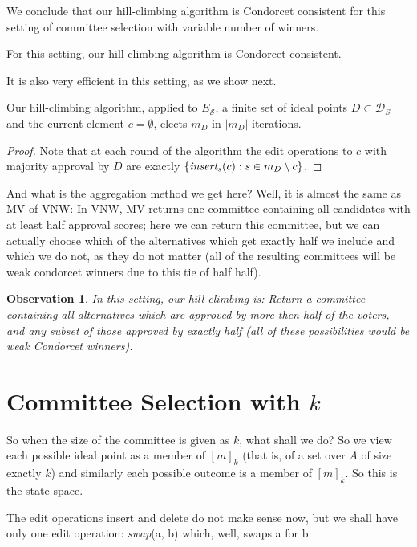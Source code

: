 \documentclass[sigconf]{aamas}  %
\newtheorem{observation}{Observation}
\newcommand{\calD}{\mathcal{D}}
\newcommand{\calS}{\mathcal{S}}
\newcommand{\iinsert}[1]{\emph{insert}_{#1}}
\begin{document}
We conclude that our hill-climbing algorithm is Condorcet consistent for this setting of committee selection with variable number of winners.

\begin{corollary}
  For this setting, our hill-climbing algorithm is Condorcet consistent.
\end{corollary}

It is also very efficient in this setting, as we show next.

\begin{lemma}
Our hill-climbing algorithm, applied to $E_\calS$,  a finite set of ideal points $D \subset \calD_S$ and the current element $c = \emptyset$, elects $m_D$ in $|m_D|$ iterations.
\end{lemma}

\begin{proof}
Note that at each round of the algorithm the edit operations to $c$ with majority approval by $D$ are exactly $\{\iinsert{s}(c) : s \in m_D \setminus c\}$.
\end{proof}

And what is the aggregation method we get here?
Well, it is almost the same as MV of VNW:
  In VNW, MV returns one committee containing all candidates with at least half approval scores; here we can return this committee, but we can actually choose which of the alternatives which get exactly half we include and which we do not, as they do not matter (all of the resulting committees will be weak condorcet winners due to this tie of half half).
  
\begin{observation}
  In this setting, our hill-climbing is:
    Return a committee containing all alternatives which are approved by more then half of the voters, and any subset of those approved by exactly half
    (all of these possibilities would be weak Condorcet winners).
\end{observation}


\section{Committee Selection with $k$}

So when the size of the committee is given as $k$, what shall we do?
So we view each possible ideal point as a member of $[m]_k$ (that is, of a set over $A$ of size exactly $k$) and similarly each possible outcome is a member of $[m]_k$.
So this is the state space.

The edit operations insert and delete do not make sense now, but we shall have only one edit operation: \emph{swap}(a, b) which, well, swaps a for b.
\end{document}
